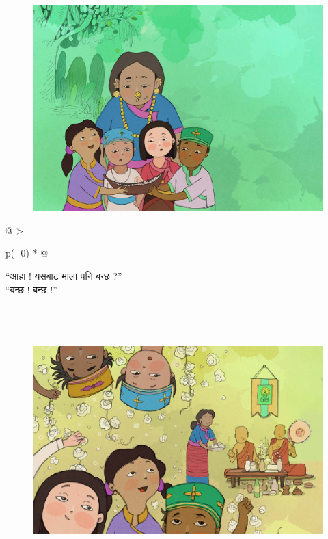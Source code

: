 \documentclass[
  letterpaper,
  DIV=11,
  numbers=noendperiod,
  paper=6in:9in,
  pagesize=pdftex,
  headinclude=on,
  footinclude=on,
  12pt]{scrreprt}
\begin{document}
\begin{figure}[H]

{\centering \includegraphics{images/p-5.jpg}

}

\end{figure}

\begin{longtable}[]{@{}
  >{\raggedright\arraybackslash}p{(\columnwidth - 0\tabcolsep) * }@{}}
\toprule\noalign{}
\endhead
\bottomrule\noalign{}
\endlastfoot
\begin{minipage}[t]{\linewidth}\raggedright
``आहा ! यसबाट माला पनि बन्छ ?''\\
``बन्छ ! बन्छ !''\strut
\end{minipage} \\
\end{longtable}


\hypertarget{section-4}{%
\chapter{}\label{section-4}}

\begin{figure}[H]

{\centering \includegraphics{images/p-6.jpg}

}

\end{figure}
\end{document}
